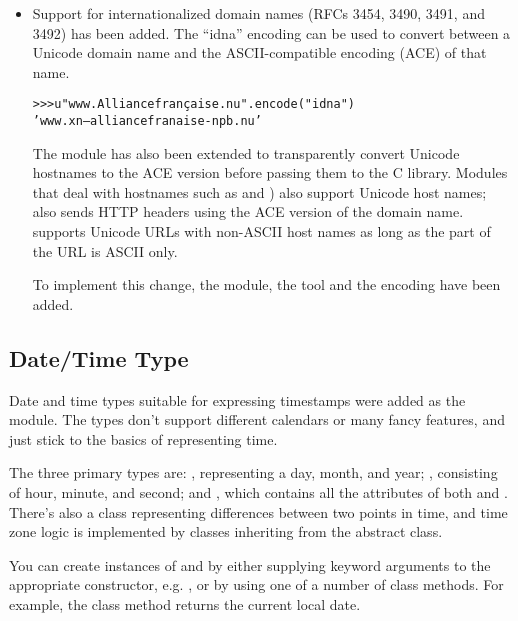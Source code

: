 \documentclass{howto}
\begin{document}
\begin{itemize}
\item Support for internationalized domain names (RFCs 3454, 3490,
3491, and 3492) has been added. The ``idna'' encoding can be used
to convert between a Unicode domain name and the ASCII-compatible
encoding (ACE) of that name.

\begin{alltt}
>{}>{}> u"www.Alliancefran\c caise.nu".encode("idna")
'www.xn--alliancefranaise-npb.nu'
\end{alltt}

The  module has also been extended to transparently
convert Unicode hostnames to the ACE version before passing them to
the C library.  Modules that deal with hostnames such as
 and ) also support Unicode host names;
 also sends HTTP  headers using the ACE
version of the domain name.   supports Unicode URLs
with non-ASCII host names as long as the  part of the URL
is ASCII only.

To implement this change, the  module, the 
 tool and the  encoding have been added.  

\end{itemize}


\subsection{Date/Time Type}

Date and time types suitable for expressing timestamps were added as
the  module.  The types don't support different
calendars or many fancy features, and just stick to the basics of
representing time.

The three primary types are: , representing a day, month,
and year; , consisting of hour, minute, and second; and
, which contains all the attributes of both
 and .  There's also a
 class representing differences between two points
in time, and time zone logic is implemented by classes inheriting from
the abstract  class.

You can create instances of  and  by either
supplying keyword arguments to the appropriate constructor,
e.g. , or by using
one of a number of class methods.  For example, the 
class method returns the current local date.
\end{document}
